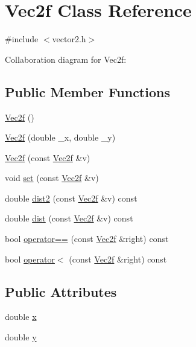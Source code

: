 \hypertarget{class_vec2f}{}\section{Vec2f Class Reference}
\label{class_vec2f}


{\ttfamily \#include $<$vector2.h$>$}



Collaboration diagram for Vec2f:
\subsection*{Public Member Functions}
\begin{DoxyCompactItemize}
\item 
\hyperlink{class_vec2f_a3582875fbf3badc6af02646e07bcf440}{Vec2f} ()
\item 
\hyperlink{class_vec2f_a3ce4919fdf7137dd1536b68f4aae53fb}{Vec2f} (double \_x, double \_y)
\item 
\hyperlink{class_vec2f_a3a41f568a8852d55f8d4989af776b798}{Vec2f} (const \hyperlink{class_vec2f}{Vec2f} \&v)
\item 
void \hyperlink{class_vec2f_a23721913973d2f6cbd337cf7355274e1}{set} (const \hyperlink{class_vec2f}{Vec2f} \&v)
\item 
double \hyperlink{class_vec2f_a9d8ee61baed27654281edb0bea4f022a}{dist2} (const \hyperlink{class_vec2f}{Vec2f} \&v) const 
\item 
double \hyperlink{class_vec2f_a648c71905bbd4376be6ffe729ab9a4e0}{dist} (const \hyperlink{class_vec2f}{Vec2f} \&v) const 
\item 
bool \hyperlink{class_vec2f_afb67dd49ed0ff76dbf4c4bd5344e2b59}{operator==} (const \hyperlink{class_vec2f}{Vec2f} \&right) const 
\item 
bool \hyperlink{class_vec2f_a32bddb3312af7d2158235c8bbb886324}{operator$<$} (const \hyperlink{class_vec2f}{Vec2f} \&right) const 
\end{DoxyCompactItemize}
\subsection*{Public Attributes}
\begin{DoxyCompactItemize}
\item 
double \hyperlink{class_vec2f_aae649f38fb692202ed76dd1783c02d1f}{x}
\item 
double \hyperlink{class_vec2f_a6215e122ad762df0beb90949f8e1859a}{y}
\end{DoxyCompactItemize}
